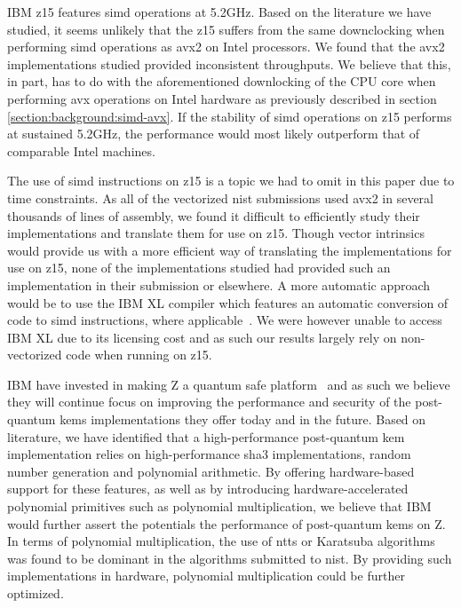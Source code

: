 IBM \gls{z15} features \gls{simd} operations at 5.2GHz. Based on the literature we have studied, it seems unlikely that the \gls{z15} suffers from the same downclocking when performing \gls{simd} operations as \gls{avx2} on Intel processors. We found that the \gls{avx2} implementations studied provided inconsistent throughputs. We believe that this, in part, has to do with the aforementioned downlocking of the CPU core when performing \gls{avx} operations on Intel hardware as previously described in section \ref{section:background:simd-avx}. If the stability of \gls{simd} operations on \gls{z15} performs at sustained 5.2GHz, the performance would most likely outperform that of comparable Intel machines.

The use of \gls{simd} instructions on \gls{z15} is a topic we had to omit in this paper due to time constraints. As all of the vectorized \gls{nist} submissions used \gls{avx2} in several thousands of lines of assembly, we found it difficult to efficiently study their implementations and translate them for use on \gls{z15}. Though vector intrinsics would provide us with a more efficient way of translating the implementations for use on \gls{z15}, none of the implementations studied had provided such an implementation in their submission or elsewhere. A more automatic approach would be to use the IBM XL compiler which features an automatic conversion of code to \gls{simd} instructions, where applicable~\cite{ibm:xl-autosimd}. We were however unable to access IBM XL due to its licensing cost and as such our results largely rely on non-vectorized code when running on \gls{z15}.

IBM have invested in making Z a quantum safe platform~\cite{ibm:z15:2019} and as such we believe they will continue focus on improving the performance and security of the \gls{post-quantum} \glspl{kem} implementations they offer today and in the future. Based on literature, we have identified that a high-performance \gls{post-quantum} \gls{kem} implementation relies on high-performance \gls{sha3} implementations, random number generation and polynomial arithmetic. By offering hardware-based support for these features, as well as by introducing hardware-accelerated polynomial primitives such as polynomial multiplication, we believe that IBM would further assert the potentials the performance of \gls{post-quantum} \glspl{kem} on Z. In terms of polynomial multiplication, the use of \glspl{ntt} or Karatsuba algorithms was found to be dominant in the algorithms submitted to \gls{nist}. By providing such implementations in hardware, polynomial multiplication could be further optimized.

